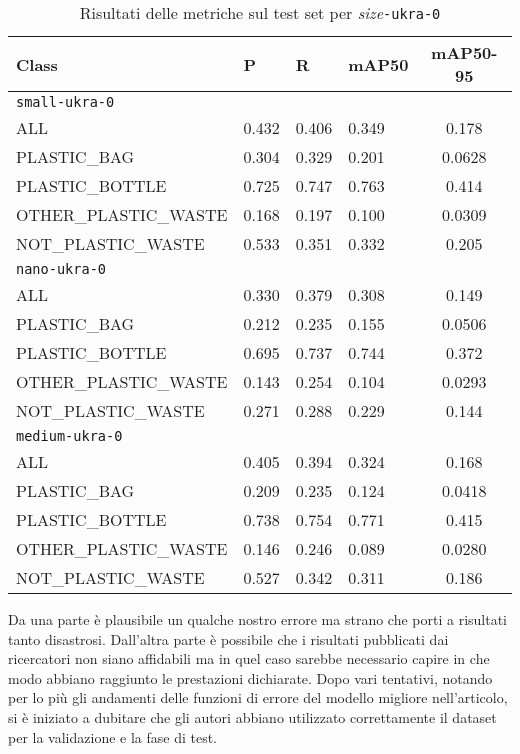     \begin{table}[!htb]
        \centering
        \begin{tabularx}{\textwidth}{lYYYc}
            \toprule
            Class & P & R & mAP50 & mAP50-95 \\
            \midrule
            \texttt{small-ukra-0} \\
            \midrule
            ALL & 0.432 & 0.406 & 0.349 & 0.178 \\
            PLASTIC\_BAG & 0.304 & 0.329 & 0.201 & 0.0628 \\
            PLASTIC\_BOTTLE & 0.725 & 0.747 & 0.763 & 0.414 \\
            OTHER\_PLASTIC\_WASTE & 0.168 & 0.197 & 0.100 & 0.0309 \\
            NOT\_PLASTIC\_WASTE & 0.533 & 0.351 & 0.332 & 0.205 \\
            \midrule
            \texttt{nano-ukra-0} \\
            \midrule
            ALL & 0.330 & 0.379 & 0.308 & 0.149 \\
            PLASTIC\_BAG & 0.212 & 0.235 & 0.155 & 0.0506 \\
            PLASTIC\_BOTTLE & 0.695 & 0.737 & 0.744 & 0.372 \\
            OTHER\_PLASTIC\_WASTE & 0.143 & 0.254 & 0.104 & 0.0293 \\
            NOT\_PLASTIC\_WASTE & 0.271 & 0.288 & 0.229 & 0.144 \\
            \midrule
            \texttt{medium-ukra-0} \\
            \midrule
            ALL & 0.405 & 0.394 & 0.324 & 0.168 \\
            PLASTIC\_BAG & 0.209 & 0.235 & 0.124 & 0.0418 \\
            PLASTIC\_BOTTLE & 0.738 & 0.754 & 0.771 & 0.415 \\
            OTHER\_PLASTIC\_WASTE & 0.146 & 0.246 & 0.089 & 0.0280 \\
            NOT\_PLASTIC\_WASTE & 0.527 & 0.342 & 0.311 & 0.186 \\
            \bottomrule
        \end{tabularx}
        \caption{Risultati delle metriche sul test set per \textit{size}\texttt{-ukra-0}}
        \label{table:v5-1}
    \end{table}

Da una parte è plausibile un qualche nostro errore ma strano che porti a risultati
tanto disastrosi. Dall'altra parte è possibile che i risultati pubblicati dai 
ricercatori non siano affidabili ma in quel caso sarebbe necessario capire in che modo 
abbiano raggiunto le prestazioni dichiarate. Dopo vari tentativi, notando per lo più 
gli andamenti delle funzioni di errore del modello migliore nell'articolo, si è iniziato a dubitare che gli 
autori abbiano utilizzato correttamente il dataset per la validazione e la fase di test.

